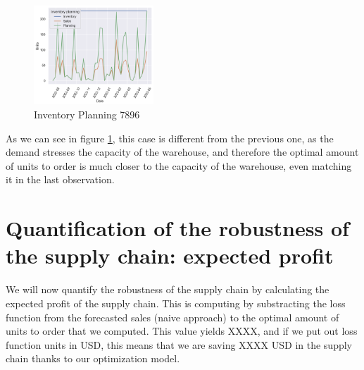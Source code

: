 \documentclass{OptiFlow}
\begin{document}
\begin{figure}[htpb]
	\centering
	\includegraphics[width=0.4\textwidth]{7896.png}
	\caption{Inventory Planning 7896}
	\label{fig:graf2}
\end{figure}

\vspace{-2mm}

As we can see in figure \ref{fig:graf2}, this case is different from the previous one, as the demand stresses the capacity of the warehouse,
and therefore the optimal amount of units to order is much closer to the capacity of the warehouse, even matching it in the last observation.

\section{Quantification of the robustness of the supply chain: expected profit}
We will now quantify the robustness of the supply chain by calculating the expected profit of the supply chain.
This is computing by substracting the loss function from the forecasted sales (naive approach) to the optimal amount of units to order that we computed.
This value yields XXXX, and if we put out loss function units in USD, this means that we are saving XXXX USD in the supply chain thanks to our optimization model.
\end{document}
